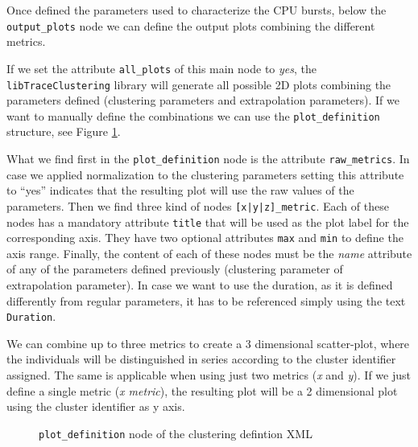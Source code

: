 \documentclass[twoside,a4,english,11pt]{book}
\begin{document}
Once defined the parameters used to characterize the CPU bursts, below
the \texttt{output\_plots} node we can define the output plots combining
the different metrics.

If we set the attribute \texttt{all\_plots} of this main node to \textit{yes},
the \texttt{libTrace\-Clustering} library will generate all possible 2D plots
combining the parameters defined (clustering parameters and extrapolation
parameters). If we want to manually define the combinations we can use 
the \texttt{plot\_definition} structure, see Figure \ref{fig:xml_plot_definition}.

What we find first in the \texttt{plot\_definition} node is the attribute
\texttt{raw\_metrics}. In case we applied normalization to the clustering
parameters setting this attribute to ``yes'' indicates that the resulting
plot will use the raw values of the parameters. Then we find three kind
of nodes \texttt{[x|y|z]\_metric}. Each of these nodes has a mandatory
attribute \texttt{title} that will be used as the plot label for the
corresponding axis. They have two optional attributes \texttt{max} and
\texttt{min} to define the axis range. Finally, the content of each of
these nodes must be the \textit{name} attribute of any of the parameters 
defined previously (clustering parameter of extrapolation parameter). In case
we want to use the duration, as it is defined differently from regular
parameters, it has to be referenced simply using the text \texttt{Duration}.

We can combine up to three metrics to create a 3 dimensional scatter-plot,
where the individuals will be distinguished in series according to the
cluster identifier assigned. The same is applicable when using just two
metrics (\textit{x} and \textit{y}). If we just define a single metric 
(\textit{x metric}), the resulting plot will be a 2 dimensional plot using
the cluster identifier as y axis.

\begin{figure}
  \centering
  \caption{\texttt{plot\_definition} node of the clustering defintion XML}
  \label{fig:xml_plot_definition}
\end{figure}

% 

\end{document}
